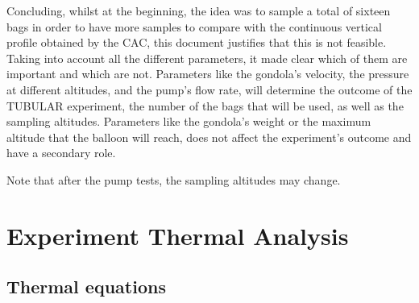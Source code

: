 \documentclass[a4paper,12pt,twoside]{article}
\begin{document}
\begin{appendices}
Concluding, whilst at the beginning, the idea was to sample a total of sixteen bags in order to have more samples to compare with the continuous vertical profile obtained by the CAC, this document justifies that this is not feasible. Taking into account all the different parameters, it made clear which of them are important and which are not. Parameters like the gondola's velocity, the pressure at different altitudes, and the pump's flow rate, will determine the outcome of the TUBULAR experiment, the number of the bags that will be used, as well as the sampling altitudes. Parameters like the gondola's weight or the maximum altitude that the balloon will reach, does not affect the experiment's outcome and have a secondary role.


Note that after the pump tests, the sampling altitudes may change.   







\newpage
\newpage
\section{Experiment Thermal Analysis} \label{sec:appI}
\subsection{Thermal equations}


\end{appendices}
\end{document}
